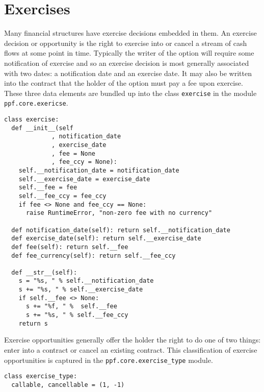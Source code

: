 \section{Exercises}
Many financial structures have exercise decisions embedded in them. An exercise decision or opportunity is 
the right to exercise into or cancel a stream of cash flows at some point in time. 
Typically the writer of the option will require some notification of exercise and so an exercise 
decision is most generally associated with two dates: a notification date and an exercise date. It may also be 
written into the contract that the holder of the option must pay a fee upon exercise. These three data elements
 are bundled up into the class \verb|exercise| in the module \verb|ppf.core.exericse|.
\begin{verbatim}
class exercise:
  def __init__(self
             , notification_date
             , exercise_date
             , fee = None
             , fee_ccy = None):
    self.__notification_date = notification_date
    self.__exercise_date = exercise_date
    self.__fee = fee
    self.__fee_ccy = fee_ccy
    if fee <> None and fee_ccy == None:
      raise RuntimeError, "non-zero fee with no currency"

  def notification_date(self): return self.__notification_date
  def exercise_date(self): return self.__exercise_date
  def fee(self): return self.__fee
  def fee_currency(self): return self.__fee_ccy

  def __str__(self):
    s = "%s, " % self.__notification_date
    s += "%s, " % self.__exercise_date
    if self.__fee <> None:
      s += "%f, " %  self.__fee
      s += "%s, " % self.__fee_ccy
    return s
\end{verbatim}
Exercise opportunities generally offer the holder the right to do one
of two things: enter into a contract or cancel an existing
contract. This classification of exercise opportunities is captured in
the \verb|ppf.core.exercise_type| module.
\begin{verbatim}
class exercise_type:
  callable, cancellable = (1, -1)
\end{verbatim}

